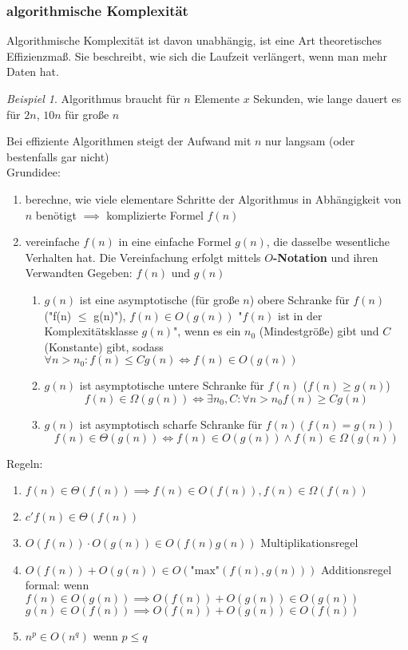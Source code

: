 \documentclass[a4paper]{scrartcl}
\DeclareMathOperator{\Exists}{\exists}%
\DeclareMathOperator{\Forall}{\forall}%
\theoremstyle{definition}
\theoremstyle{plain}
\theoremstyle{remark}
\theoremstyle{remark}
\newtheorem{ex}{Beispiel}
\begin{document}
\subsubsection{algorithmische Komplexität}
\label{sec-15-1-2}
Algorithmische Komplexität ist davon unabhängig, ist eine Art theoretisches Effizienzmaß. Sie
beschreibt, wie sich die Laufzeit verlängert, wenn man mehr Daten hat.

\begin{ex}
Algorithmus braucht für $n$ Elemente $x$ Sekunden, wie lange dauert es für $2n$, $10n$ für große $n$
\end{ex}
Bei effiziente Algorithmen steigt der Aufwand mit $n$ nur langsam (oder bestenfalls gar nicht) \\
        Grundidee:
\begin{enumerate}
\item berechne, wie viele elementare Schritte der Algorithmus in Abhängigkeit von $n$ benötigt $\implies$ komplizierte Formel $f(n)$
\item vereinfache $f(n)$ in eine einfache Formel $g(n)$, die dasselbe wesentliche Verhalten hat. Die Vereinfachung erfolgt mittels \textbf{$O$-Notation} und ihren Verwandten
Gegeben: $f(n)$ und $g(n)$
\begin{enumerate}
\item $g(n)$ ist eine asymptotische (für große $n$) obere Schranke für $f(n)$ ("f(n) $\le$ g(n)"), $f(n) \in O(g(n))$ "$f(n)$ ist in der Komplexitätsklasse $g(n)$", wenn es ein $n_0$ (Mindestgröße) gibt
und $C$ (Konstante) gibt, sodass $\Forall n > n_0: f(n) \leq C g(n) \iff f(n) \in O(g(n))$
\item $g(n)$ ist asymptotische untere Schranke für $f(n)$ ($f(n) \geq g(n)$)
\[f(n) \in \Omega(g(n)) \iff \Exists n_0,C : \Forall n > n_0 f(n) \geq C g(n)\]
\item $g(n)$ ist asymptotisch scharfe Schranke für $f(n) (f(n) = g(n))$
                  \[f(n) \in \Theta(g(n)) \iff f(n) \in O(g(n)) \wedge f(n) \in \Omega(g(n))\]
\end{enumerate}
\end{enumerate}
Regeln:
\begin{enumerate}
\item $f(n) \in \Theta(f(n)) \implies f(n) \in O(f(n)), f(n) \in \Omega(f(n))$
\item $c' f(n) \in \Theta(f(n))$
\item $O(f(n)) \cdot O(g(n)) \in O(f(n) g(n))$ \hfill Multiplikationsregel
\item $O(f(n)) + O(g(n)) \in O(\text{"max"}(f(n), g(n)))$ \hfill Additionsregel \\
           formal: wenn $f(n) \in O(g(n)) \implies O(f(n)) + O(g(n)) \in O(g(n))$ \\
           $g(n) \in O(f(n)) \implies O(f(n)) + O(g(n)) \in O(f(n))$
\item $n^p \in O(n^q)$ wenn $p \leq q$
\end{enumerate}
\end{document}
